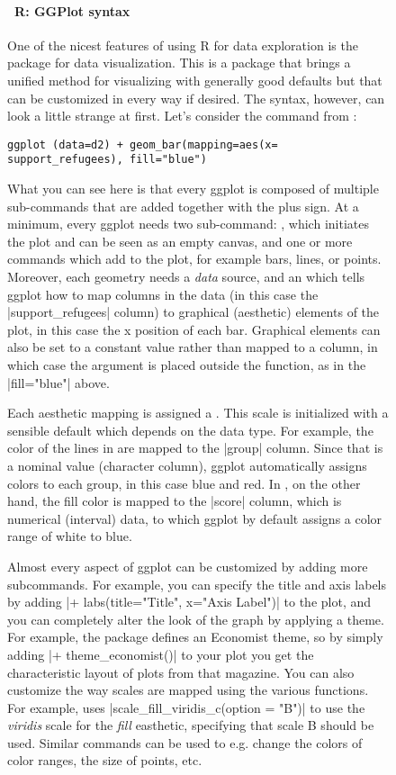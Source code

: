 \begin{figure}
  \vspace{-1em}
\begin{feature}
\footnotesize  \paragraph{\footnotesize\ R: GGPlot syntax}

One of the nicest features of using R for data exploration is the  package for data visualization. This is a package that brings a unified method for visualizing with generally good defaults but that can be customized in every way if desired. The syntax, however, can look a little strange at first. 
Let's consider the command from :
\begin{verbatim}
ggplot (data=d2) + geom_bar(mapping=aes(x= support_refugees), fill="blue")
\end{verbatim}
What you can see here is that every ggplot is composed of multiple sub-commands that are added together with the plus sign. At a minimum, every ggplot needs two sub-command: , which initiates the plot and can be seen as an empty canvas, and one or more  commands which add  to the plot, for example bars, lines, or points. Moreover, each geometry needs a \emph{data} source, and an  which tells ggplot how to map columns in the data (in this case the |support_refugees| column) to graphical (aesthetic) elements of the plot, in this case the x position of each bar. Graphical elements can also be set to a constant value rather than mapped to a column, in which case the argument is placed outside the  function, as in the |fill="blue"| above.

Each aesthetic mapping is assigned a . This scale is initialized with a sensible default which depends on the data type. For example, the color of the lines in   are mapped to the |group| column. Since that is a nominal value (character column), ggplot automatically assigns colors to each group, in this case blue and red.  In , on the other hand, the fill color is mapped to the |score| column, which is numerical (interval) data, to which ggplot by default assigns a color range of white to blue.

Almost every aspect of ggplot can be customized by adding more subcommands. For example, you can specify the title and axis labels by adding |+ labs(title="Title", x="Axis Label")| to the plot, and you can completely alter the look of the graph by applying a theme. For example, the  package defines an Economist theme, so by simply adding |+ theme_economist()| to your plot you get the characteristic layout of plots from that magazine.
You can also customize the way scales are mapped using the various  functions. For example,  uses |scale_fill_viridis_c(option = "B")| to use the \emph{viridis} scale for the \emph{fill} easthetic, specifying that scale B should be used. Similar commands can be used to e.g. change the colors of color ranges, the size of points, etc.


\end{feature}
\end{figure}
